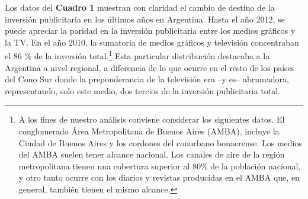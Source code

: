 {Los datos del \textbf{Cuadro 1} muestran con claridad el cambio de destino de la inversión publicitaria en los últimos años en Argentina. Hasta el año 2012, se puede apreciar la paridad en la inversión publicitaria entre los medios gráficos y la TV. En el año 2010, la sumatoria de medios gráficos y televisión concentraban el 86 \% de la inversión total.\footnote{A los fines de nuestro análisis conviene considerar los siguientes datos. El conglomerado Área Metropolitana de Buenos Aires (AMBA), incluye la Ciudad de Buenos Aires y los cordones del conurbano bonaerense. Los medios del AMBA suelen tener alcance nacional. Los canales de aire de la región metropolitana tienen una cobertura superior al 80\% de la población nacional, y otro tanto ocurre con los diarios y revistas producidas en el AMBA que, en general, también tienen el mismo alcance.} Esta particular distribución destacaba a la Argentina a nivel regional, a diferencia de lo que ocurre en el resto de los países del Cono Sur donde la preponderancia de la televisión era --y es-- abrumadora, representando, solo este medio, dos tercios de la inversión publicitaria total.

}
